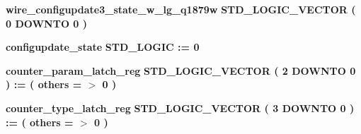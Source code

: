 \begin{DoxyCompactItemize}
\item 
{\bf wire\+\_\+configupdate3\+\_\+state\+\_\+w\+\_\+lg\+\_\+q1879w} {\bfseries \textcolor{comment}{S\+T\+D\+\_\+\+L\+O\+G\+I\+C\+\_\+\+V\+E\+C\+T\+OR}\textcolor{vhdlchar}{ }\textcolor{vhdlchar}{(}\textcolor{vhdlchar}{ }\textcolor{vhdlchar}{ } \textcolor{vhdldigit}{0} \textcolor{vhdlchar}{ }\textcolor{keywordflow}{D\+O\+W\+N\+TO}\textcolor{vhdlchar}{ }\textcolor{vhdlchar}{ } \textcolor{vhdldigit}{0} \textcolor{vhdlchar}{ }\textcolor{vhdlchar}{)}\textcolor{vhdlchar}{ }} 
\item 
{\bf configupdate\+\_\+state} {\bfseries \textcolor{comment}{S\+T\+D\+\_\+\+L\+O\+G\+IC}\textcolor{vhdlchar}{ }\textcolor{vhdlchar}{ }\textcolor{vhdlchar}{\+:}\textcolor{vhdlchar}{=}\textcolor{vhdlchar}{ }\textcolor{vhdlchar}{ }\textcolor{vhdlchar}{\textquotesingle{}}\textcolor{vhdlchar}{ } \textcolor{vhdldigit}{0} \textcolor{vhdlchar}{ }\textcolor{vhdlchar}{\textquotesingle{}}\textcolor{vhdlchar}{ }} 
\item 
{\bf counter\+\_\+param\+\_\+latch\+\_\+reg} {\bfseries \textcolor{comment}{S\+T\+D\+\_\+\+L\+O\+G\+I\+C\+\_\+\+V\+E\+C\+T\+OR}\textcolor{vhdlchar}{ }\textcolor{vhdlchar}{(}\textcolor{vhdlchar}{ }\textcolor{vhdlchar}{ } \textcolor{vhdldigit}{2} \textcolor{vhdlchar}{ }\textcolor{keywordflow}{D\+O\+W\+N\+TO}\textcolor{vhdlchar}{ }\textcolor{vhdlchar}{ } \textcolor{vhdldigit}{0} \textcolor{vhdlchar}{ }\textcolor{vhdlchar}{)}\textcolor{vhdlchar}{ }\textcolor{vhdlchar}{ }\textcolor{vhdlchar}{ }\textcolor{vhdlchar}{\+:}\textcolor{vhdlchar}{=}\textcolor{vhdlchar}{ }\textcolor{vhdlchar}{(}\textcolor{vhdlchar}{ }\textcolor{vhdlchar}{ }\textcolor{keywordflow}{others}\textcolor{vhdlchar}{ }\textcolor{vhdlchar}{ }\textcolor{vhdlchar}{=}\textcolor{vhdlchar}{ }\textcolor{vhdlchar}{$>$}\textcolor{vhdlchar}{ }\textcolor{vhdlchar}{\textquotesingle{}}\textcolor{vhdlchar}{ } \textcolor{vhdldigit}{0} \textcolor{vhdlchar}{ }\textcolor{vhdlchar}{\textquotesingle{}}\textcolor{vhdlchar}{ }\textcolor{vhdlchar}{)}\textcolor{vhdlchar}{ }} 
\item 
{\bf counter\+\_\+type\+\_\+latch\+\_\+reg} {\bfseries \textcolor{comment}{S\+T\+D\+\_\+\+L\+O\+G\+I\+C\+\_\+\+V\+E\+C\+T\+OR}\textcolor{vhdlchar}{ }\textcolor{vhdlchar}{(}\textcolor{vhdlchar}{ }\textcolor{vhdlchar}{ } \textcolor{vhdldigit}{3} \textcolor{vhdlchar}{ }\textcolor{keywordflow}{D\+O\+W\+N\+TO}\textcolor{vhdlchar}{ }\textcolor{vhdlchar}{ } \textcolor{vhdldigit}{0} \textcolor{vhdlchar}{ }\textcolor{vhdlchar}{)}\textcolor{vhdlchar}{ }\textcolor{vhdlchar}{ }\textcolor{vhdlchar}{ }\textcolor{vhdlchar}{\+:}\textcolor{vhdlchar}{=}\textcolor{vhdlchar}{ }\textcolor{vhdlchar}{(}\textcolor{vhdlchar}{ }\textcolor{vhdlchar}{ }\textcolor{keywordflow}{others}\textcolor{vhdlchar}{ }\textcolor{vhdlchar}{ }\textcolor{vhdlchar}{=}\textcolor{vhdlchar}{ }\textcolor{vhdlchar}{$>$}\textcolor{vhdlchar}{ }\textcolor{vhdlchar}{\textquotesingle{}}\textcolor{vhdlchar}{ } \textcolor{vhdldigit}{0} \textcolor{vhdlchar}{ }\textcolor{vhdlchar}{\textquotesingle{}}\textcolor{vhdlchar}{ }\textcolor{vhdlchar}{)}\textcolor{vhdlchar}{ }} 

\end{DoxyCompactItemize}
